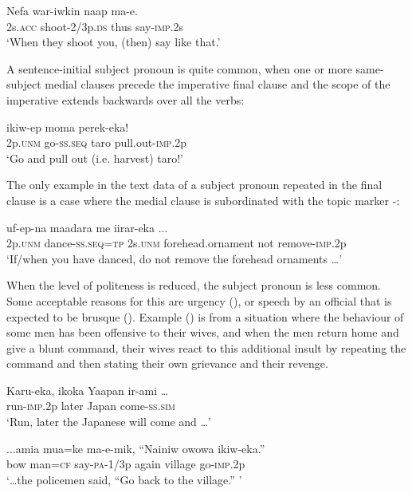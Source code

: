 \ea%
\label{ex:x1775}
\gll Nefa war-iwkin naap ma-e. \\
2s.\textsc{acc} shoot-2/3p.\textsc{ds} thus say-\textsc{imp}.2s\\
\glt`When they shoot you, (then) say like that.'
\z

A sentence-initial subject pronoun is quite common, when one or more same-subject medial clauses precede the imperative final clause and the scope of the imperative extends backwards over all the verbs:

\ea%
\label{ex:x628}
\gll {} ikiw-ep moma perek-eka! \\
2p.\textsc{unm} go-\textsc{ss}.\textsc{seq} taro pull.out-\textsc{imp}.2p\\
\glt`Go and pull out (i.e. harvest) taro!'
\z

The only example in the text data of a subject pronoun repeated in the final clause is a case where the medial clause is subordinated with the topic marker -: 

\ea%
\label{ex:x1776}
\gll {} uf-ep-na  maadara me iirar-eka ...\\
2p.\textsc{unm} dance-\textsc{ss}.\textsc{seq}=\textsc{tp} 2s.\textsc{unm} forehead.ornament not remove-\textsc{imp}.2p\\
\glt`If/when you have danced, do not remove the forehead ornaments {\dots}' 
\z

When the level of politeness is reduced, the subject pronoun is less common. Some acceptable reasons for this are urgency (), or speech by an official that is expected to be brusque (). Example () is from a situation where the behaviour of some men has been offensive to their wives, and when the men return home and give a blunt command, their wives react to this additional insult by repeating the command and then stating their own grievance and their revenge. 

\ea%
\label{ex:x1777}
\gll Karu-eka, ikoka Yaapan ir-ami {\dots} \\
run-\textsc{imp}.2p later Japan come-\textsc{ss}.\textsc{sim}\\
\glt`Run, later the Japanese will come and {\dots}'
\z

\ea%
\label{ex:x1778}
\gll ...amia mua=ke ma-e-mik, ``Nainiw owowa ikiw-eka.'' \\
bow man=\textsc{cf} say-\textsc{pa}-1/3p again village go-\textsc{imp}.2p\\
\glt`{\dots}the policemen said, ``Go back to the village.'' '
\z

